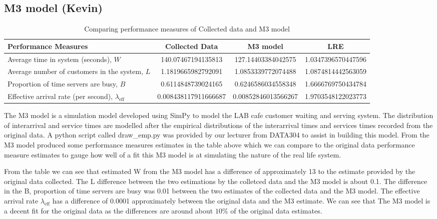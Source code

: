\documentclass{article}
\begin{document}
\subsection{M3 model (Kevin)}

\begin{table}[H]
    \centering
    \caption{Comparing performance measures of Collected data and M3 model}
    \begin{tabu}{X S S S}
        \toprule
        \textbf{Performance Measures} & \textbf{Collected Data} & \textbf{M3 model}& \textbf{LRE}\\
        \midrule
        Average time in system (seconds), $W$ & 140.07467194135813 & 127.14403384042575 & 1.0347396570447596\\
        Average number of customers in the system, $L$ & 1.1819665982792091 & 1.0853339772074488 & 1.0874814442563059\\
        Proportion of time servers are busy, $B$ & 0.6114848739024165 & 0.6246586034558348 & 1.6666769750434784\\
        Effective arrival rate (per second), $\lambda_{\text{eff}}$ & 0.008438117911666687 & 0.00852846013566267 & 1.9703548122023773\\
        \bottomrule
    \end{tabu}
    \label{tab:M3}
\end{table}

The M3 model is a simulation model developed using SimPy to model the LAB cafe customer waiting and serving system. The distribution of interarrival and service times are modelled after the empirical distributions of the interarrival times and services times recorded from the original data. A python script called draw\_emp.py was provided by our lecturer\cite{drawemp} from DATA304 to assist in building this model. From the M3 model produced some performance measures estimates in the table above which we can compare to the original data performance measure estimates to gauge how well of a fit this M3 model is at simulating the nature of the real life system.

From the table we can see that estimated W from the M3 model has a difference of approximately 13 to the estimate provided by the original data collected. The L difference between the two estimations by the colletced data and the M3 model is about 0.1. The difference in the B, proportion of time servers are busy was 0.01 between the two estimates of the collected data and the M3 model. The effective arrival rate $\lambda_{\text{eff}}$ has a difference of 0.0001 approximately between the original data and the M3 estimate. We can see that The M3 model is a decent fit for the original data as the differences are around about $10\%$ of the original data estimates.
\end{document}
